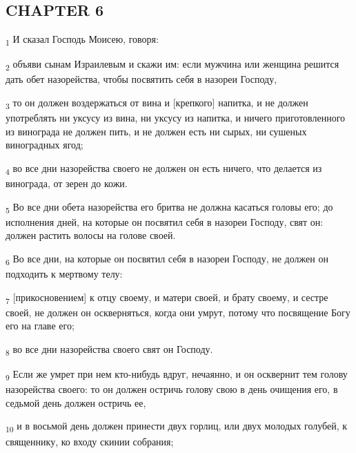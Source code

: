 \subsection{CHAPTER 6}
\begin{tcolorbox}
\textsubscript{1} И сказал Господь Моисею, говоря:
\end{tcolorbox}
\begin{tcolorbox}
\textsubscript{2} объяви сынам Израилевым и скажи им: если мужчина или женщина решится дать обет назорейства, чтобы посвятить себя в назореи Господу,
\end{tcolorbox}
\begin{tcolorbox}
\textsubscript{3} то он должен воздержаться от вина и [крепкого] напитка, и не должен употреблять ни уксусу из вина, ни уксусу из напитка, и ничего приготовленного из винограда не должен пить, и не должен есть ни сырых, ни сушеных виноградных ягод;
\end{tcolorbox}
\begin{tcolorbox}
\textsubscript{4} во все дни назорейства своего не должен он есть ничего, что делается из винограда, от зерен до кожи.
\end{tcolorbox}
\begin{tcolorbox}
\textsubscript{5} Во все дни обета назорейства его бритва не должна касаться головы его; до исполнения дней, на которые он посвятил себя в назореи Господу, свят он: должен растить волосы на голове своей.
\end{tcolorbox}
\begin{tcolorbox}
\textsubscript{6} Во все дни, на которые он посвятил себя в назореи Господу, не должен он подходить к мертвому телу:
\end{tcolorbox}
\begin{tcolorbox}
\textsubscript{7} [прикосновением] к отцу своему, и матери своей, и брату своему, и сестре своей, не должен он оскверняться, когда они умрут, потому что посвящение Богу его на главе его;
\end{tcolorbox}
\begin{tcolorbox}
\textsubscript{8} во все дни назорейства своего свят он Господу.
\end{tcolorbox}
\begin{tcolorbox}
\textsubscript{9} Если же умрет при нем кто-нибудь вдруг, нечаянно, и он осквернит тем голову назорейства своего: то он должен остричь голову свою в день очищения его, в седьмой день должен остричь ее,
\end{tcolorbox}
\begin{tcolorbox}
\textsubscript{10} и в восьмой день должен принести двух горлиц, или двух молодых голубей, к священнику, ко входу скинии собрания;
\end{tcolorbox}
